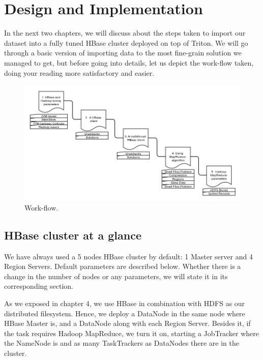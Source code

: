 \chapter{Design and Implementation}
\label{chapter:Design and Implementation}



In the next two chapters, we will discuss about the steps taken to import our dataset into a fully tuned HBase cluster deployed on top of Triton. We will go through a basic version of importing data to the most fine-grain solution we managed to get, but before going into details, let us depict the work-flow taken, doing your reading more satisfactory and easier.


\bigskip
\begin{figure}[htb]
\centering
\includegraphics[width=1\textwidth]{./images/approaches.png}
\caption{Work-flow.} \label{fig:approaches}
\end{figure}




\section{HBase cluster at a glance}

We have always used a 5 nodes HBase cluster by default: 1 Master server and 4 Region Servers. Default parameters are described below. Whether there is a change in the number of nodes or any parameters, we will state it in its corresponding section.
\par
As we exposed in chapter 4, we use HBase in combination with HDFS as our distributed filesystem. Hence, we deploy a DataNode in the same node where HBase Master is, and a DataNode along with each Region Server. Besides it, if the task requires Hadoop MapReduce, we turn it on, starting a JobTracker where the NameNode is and as many TaskTrackers as DataNodes there are in the cluster.

